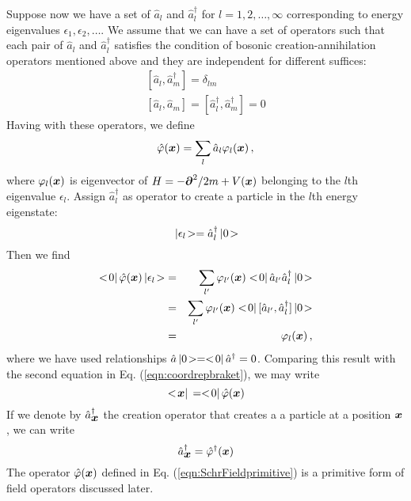 \bigskip
Suppose now we have a set of $\hat{a}_l$  and $\hat{a}_l^\dagger$ for $l = 1, 2, \dots, \infty$
corresponding to energy eigenvalues $\epsilon_1, \epsilon_2,\dots$.
We assume that we can have a set of operators such that each pair of $\hat{a}_l$  and $\hat{a}_l^\dagger$
satisfies the condition of bosonic creation-annihilation operators mentioned above and they are independent
for different suffices:
\begin{equation}
\begin{array}{l}
[\hat{a}_l, \hat{a}^\dagger_m] = \delta_{lm}
\\
\left[ \hat{a}_l, \hat{a}_m \right] 
= [\hat{a}^\dagger_l, \hat{a}^\dagger_m] = 0
\end{array}
\label{eqn:Nbodycreanncomm}
\end{equation}
Having with these operators, we define
\begin{equation}
\hat{\varphi}(\mbox{\boldmath $x$}) = \sum_l \hat{a}_l \varphi_l (\mbox{\boldmath $x$})\,,
\label{eqn:SchrFieldprimitive}
\end{equation}
where $\varphi_l (\mbox{\boldmath $x$})$ is eigenvector of $H = -\mbox{\boldmath $\partial$}^2/2m + V(\mbox{\boldmath $x$})$ belonging
to the $l$th eigenvalue $\epsilon_l$.
Assign $\hat{a}_l^\dagger$ as operator to create a particle in the $l$th energy eigenstate:
\begin{equation}
\,| \epsilon_l \!> = \hat{a}_l^\dagger \,| 0 \!>
\end{equation}
Then we find
\begin{eqnarray}
<\! 0 |\, \hat{\varphi}(\mbox{\boldmath $x$}) \,| \epsilon_l \!>
&=&
\sum_{l'} \varphi_{l'} (\mbox{\boldmath $x$}) 
<\! 0 |\, \hat{a}_{l'} \hat{a}_l^\dagger \,| 0 \!>
\nonumber\\
&=&
\sum_{l'} \varphi_{l'} (\mbox{\boldmath $x$}) 
<\! 0 |\, [\hat{a}_{l'}, \hat{a}_l^\dagger] \,| 0 \!>
\nonumber\\
&=&
\varphi_{l} (\mbox{\boldmath $x$}) \,,
\end{eqnarray}
where we have used relationships $\hat{a} \,| 0 \!> = <\! 0 |\, \hat{a}^\dagger= 0$.
Comparing this result with the second equation in Eq. (\ref{eqn:coordrepbraket}), we may write
\begin{equation}
<\! \mbox{\boldmath $x$} |\, = <\! 0 |\, \hat{\varphi}(\mbox{\boldmath $x$})
\end{equation}
If we denote by $\hat{a}^\dagger_{\mbox{\boldmath $x$}}$ the creation operator 
that creates a a particle at a position $\mbox{\boldmath $x$}$, we can write
\begin{equation}
\hat{a}^\dagger_{\mbox{\boldmath $x$}} = \hat{\varphi}^\dagger(\mbox{\boldmath $x$})
\end{equation}
The operator $\hat{\varphi}(\mbox{\boldmath $x$})$ defined in Eq. (\ref{eqn:SchrFieldprimitive})
is a primitive form of field operators discussed later.
 
